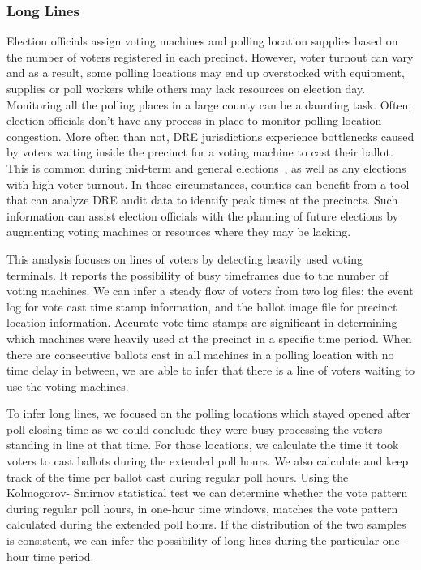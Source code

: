 \subsubsection{Long Lines}
Election officials assign voting machines and polling location supplies based on the number of voters registered in each precinct.  However, voter turnout can vary and as a result, some polling locations may end up overstocked with equipment, supplies or poll workers while others may lack resources on election day. Monitoring all the polling places in a large county can be a daunting task. Often, election officials don't have any process in place to monitor polling location congestion. More often than not, DRE jurisdictions experience bottlenecks caused by voters waiting inside the precinct for a voting machine to cast their ballot. This is common during mid-term and general elections~\cite{Kreitman2010, Slade2008, U2010}, as well as any elections with high-voter turnout.  In those circumstances, counties can benefit from a tool that can analyze DRE audit data to identify peak times at the precincts. Such information can assist election officials with the planning of future elections by augmenting voting machines or resources where they may be lacking.

This analysis focuses on lines of voters by detecting heavily used voting terminals. It reports the possibility of busy timeframes due to the number of voting machines. We can infer a steady flow of voters from two log files: the event log for vote cast time stamp information, and the ballot image file for precinct location information. Accurate vote time stamps are significant in determining which machines were heavily used at the precinct in a specific time period. When there are consecutive ballots cast in all machines in a polling location with no time delay in between, we are able to infer that there is a line of voters waiting to use the voting machines. 

To infer long lines, we focused on the polling locations which stayed opened after poll closing time as we could conclude they were busy processing the voters standing in line at that time. For those locations, we calculate the time it took voters to cast ballots during the extended poll hours. We also calculate and keep track of the time per ballot cast during regular poll hours. Using the Kolmogorov- Smirnov statistical test we can determine whether the vote pattern during regular poll hours, in one-hour time windows, matches the vote pattern calculated during the extended poll hours. If the distribution of the two samples is consistent, we can infer the possibility of long lines during the particular one-hour time period.
